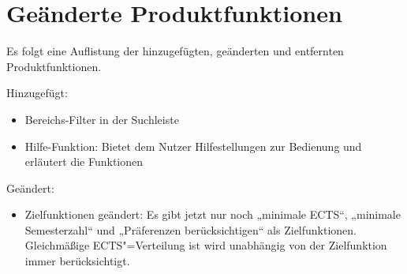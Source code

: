 \FloatBarrier
\section{Geänderte Produktfunktionen}

Es folgt eine Auflistung der hinzugefügten, geänderten und entfernten Produktfunktionen.

Hinzugefügt:
\begin{itemize}
	\item Bereichs-Filter in der Suchleiste
	\item Hilfe-Funktion: Bietet dem Nutzer Hilfestellungen zur Bedienung und erläutert die Funktionen
\end{itemize}

Geändert: 
\begin{itemize}
	\item Zielfunktionen geändert: Es gibt jetzt nur noch „minimale ECTS“, „minimale Semesterzahl“ und „Präferenzen berücksichtigen“ als Zielfunktionen. Gleichmäßige ECTS"=Verteilung ist wird unabhängig von der Zielfunktion immer berücksichtigt.
\end{itemize}